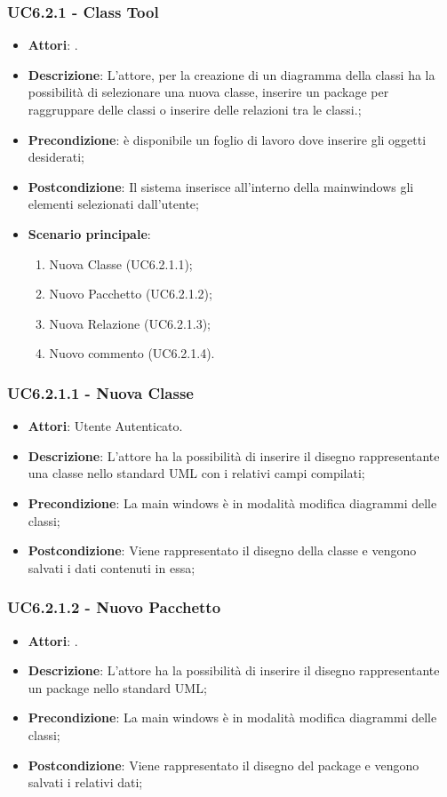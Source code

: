 \subsubsection{UC6.2.1 - Class Tool} 
\label{sssec:UC6.2.1} 
\begin{itemize} 
\item \textbf{Attori}: .
\item \textbf{Descrizione}: L'attore, per la creazione di un diagramma della classi ha la possibilità di selezionare una nuova classe, inserire un package per raggruppare delle classi o inserire delle relazioni tra le classi.;
\item \textbf{Precondizione}: è disponibile un foglio di lavoro dove inserire gli oggetti desiderati;
\item \textbf{Postcondizione}: Il sistema inserisce all'interno della mainwindows gli elementi selezionati dall'utente;
\item \textbf{Scenario principale}: \begin{enumerate}\item Nuova Classe (UC6.2.1.1);\item Nuovo Pacchetto (UC6.2.1.2);\item Nuova Relazione (UC6.2.1.3);\item Nuovo commento (UC6.2.1.4). 
 \end{enumerate}
\end{itemize} 
\subsubsection{UC6.2.1.1 - Nuova Classe} 
\label{sssec:UC6.2.1.1} 
\begin{itemize} 
\item \textbf{Attori}: Utente Autenticato.
\item \textbf{Descrizione}: L'attore ha la possibilità di inserire il disegno rappresentante una classe nello standard UML con i relativi campi compilati;
\item \textbf{Precondizione}: La main windows è in modalità modifica diagrammi delle classi;
\item \textbf{Postcondizione}: Viene rappresentato il disegno della classe e vengono salvati i dati contenuti in essa;
\end{itemize} 
\subsubsection{UC6.2.1.2 - Nuovo Pacchetto} 
\label{sssec:UC6.2.1.2} 
\begin{itemize} 
\item \textbf{Attori}: .
\item \textbf{Descrizione}: L'attore ha la possibilità di inserire il disegno rappresentante un package nello standard UML;
\item \textbf{Precondizione}: La main windows è in modalità modifica diagrammi delle classi;
\item \textbf{Postcondizione}: Viene rappresentato il disegno del package e vengono salvati i relativi dati;
\end{itemize} 
